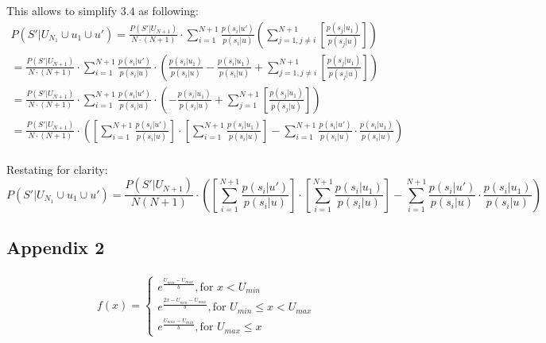 \documentclass[11pt]{article}
\begin{document}
This allows to simplify $3.4$ as following:
\begin{align}
P(S'|U_{N_1} \cup u_1 \cup u' ) =  \frac{P(S'|U_{N+1})}{N \cdot (N+1)} \cdot  \sum_{i=1}^{N+1}  \frac{p(s_i|u')}{p(s_i|u)}\left (  \sum_{j=1, j\ne i}^{N+1} \left [ \frac{p(s_j|u_1)}{p(s_j|u)} \right ] \right  )  \\
= \frac{P(S'|U_{N+1})}{N \cdot (N+1)} \cdot  \sum_{i=1}^{N+1}  \frac{p(s_i|u')}{p(s_i|u)} \cdot \left (   \frac{p(s_i|u_1)}{ p(s_i|u) } -  \frac{p(s_i|u_1)}{ p(s_i|u) }  + \sum_{j=1, j\ne i}^{N+1} \left [ \frac{p(s_j|u_1)}{p(s_j|u)} \right ] \right  ) \\
=  \frac{P(S'|U_{N+1})}{N \cdot (N+1)} \cdot  \sum_{i=1}^{N+1}  \frac{p(s_i|u')}{p(s_i|u)} \cdot \left ( - \frac{p(s_i|u_1)}{ p(s_i|u) }  + \sum_{j=1}^{N+1} \left [ \frac{p(s_j|u_1)}{p(s_j|u)} \right ] \right  ) \\
=  \frac{P(S'|U_{N+1})}{N \cdot (N+1)} \cdot  \left (  \left [ \sum_{i=1}^{N+1}  \frac{p(s_i|u')}{p(s_i|u)} \right ] \cdot  \left [  \sum_{i=1}^{N+1}  \frac{p(s_i|u_1)}{p(s_i|u)} \right ] - \sum_{i=1}^{N+1}  \frac{p(s_i|u')}{p(s_i|u)} \cdot  \frac{p(s_i|u_1)}{p(s_i|u)} \right ) \\
\end{align} 

Restating for clarity:
 \begin{equation}  
P(S'|U_{N_1} \cup u_1 \cup u' ) =  \frac{P(S'|U_{N+1})}{N(N+1)} \cdot \left (  \left [ \sum_{i=1}^{N+1}  \frac{p(s_i|u')}{p(s_i|u)} \right ] \cdot  \left [  \sum_{i=1}^{N+1}  \frac{p(s_i|u_1)}{p(s_i|u)} \right ] - \sum_{i=1}^{N+1}  \frac{p(s_i|u')}{p(s_i|u)} \cdot  \frac{p(s_i|u_1)}{p(s_i|u)} \right )
\end{equation}

\subsection{Appendix 2}

\begin{align}
f(x) = \left\{
 \begin{matrix} 
e^{\frac{U_{min} - U_{max}}{b}}, \text{for }  x < U_{min}   \\ 
e^{\frac{2x - U_{min} - U_{max}}{b}}, \text{for }  U_{min} \le x < U_{max} \\
 e^{\frac{U_{max} -U_{min}}{b}}, \text{for }   U_{max} \le x
  \end{matrix}\right.
\end{align}
\end{document}

